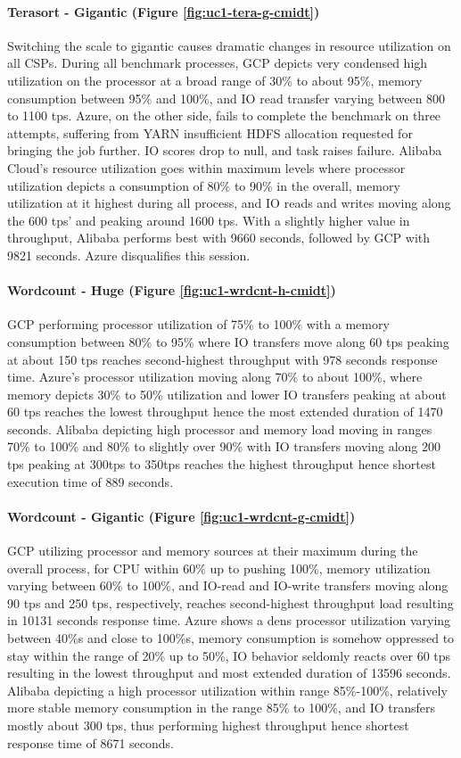 \documentclass[review]{elsarticle}
\begin{document}
\paragraph{Terasort - Gigantic (Figure \ref{fig:uc1-tera-g-cmidt})}Switching the scale to gigantic causes dramatic changes in resource utilization on all CSPs. During all benchmark processes, GCP depicts very condensed high utilization on the processor at a broad range of 30\% to about 95\%, memory consumption between 95\% and 100\%, and IO read transfer varying between 800 to 1100 tps. Azure, on the other side, fails to complete the benchmark on three attempts, suffering from YARN insufficient HDFS allocation requested for bringing the job further. IO scores drop to null, and task raises failure. Alibaba Cloud's resource utilization goes within maximum levels where processor utilization depicts a consumption of 80\% to 90\% in the overall, memory utilization at it highest during all process, and IO reads and writes moving along the 600 tps' and peaking around 1600 tps. With a slightly higher value in throughput, Alibaba performs best with 9660 seconds, followed by GCP with 9821 seconds. Azure disqualifies this session.

\paragraph{Wordcount - Huge (Figure \ref{fig:uc1-wrdcnt-h-cmidt})}GCP performing processor utilization of 75\% to 100\% with a memory consumption between 80\% to 95\% where IO transfers move along 60 tps peaking at about 150 tps reaches second-highest throughput with 978 seconds response time. Azure's processor utilization moving along 70\% to about 100\%, where memory depicts 30\% to 50\% utilization and lower IO transfers peaking at about 60 tps reaches the lowest throughput hence the most extended duration of 1470 seconds. Alibaba depicting high processor and memory load moving in ranges 70\% to 100\% and 80\% to slightly over 90\% with IO transfers moving along 200 tps peaking at 300tps to 350tps reaches the highest throughput hence shortest execution time of 889 seconds.

\paragraph{Wordcount - Gigantic (Figure \ref{fig:uc1-wrdcnt-g-cmidt})}GCP utilizing processor and memory sources at their maximum during the overall process, for CPU within 60\% up to pushing 100\%, memory utilization varying between 60\% to 100\%, and IO-read and IO-write transfers moving along 90 tps and 250 tps, respectively, reaches second-highest throughput load resulting in 10131 seconds response time. Azure shows a dens processor utilization varying between 40\%s and close to 100\%s, memory consumption is somehow oppressed to stay within the range of 20\% up to 50\%, IO behavior seldomly reacts over 60 tps resulting in the lowest throughput and most extended duration of 13596 seconds. Alibaba depicting a high processor utilization within range 85\%-100\%, relatively more stable memory consumption in the range 85\% to 100\%, and IO transfers mostly about 300 tps, thus performing highest throughput hence shortest response time of 8671 seconds.
\end{document}
